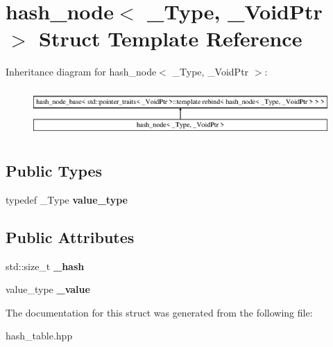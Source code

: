 \section{hash\+\_\+node$<$ \+\_\+\+Type, \+\_\+\+Void\+Ptr $>$ Struct Template Reference}
\label{structhash__node}
Inheritance diagram for hash\+\_\+node$<$ \+\_\+\+Type, \+\_\+\+Void\+Ptr $>$\+:\begin{figure}[H]
\begin{center}
\leavevmode
\includegraphics[height=1.854305cm]{structhash__node}
\end{center}
\end{figure}
\subsection*{Public Types}
\begin{DoxyCompactItemize}
\item 
typedef \+\_\+\+Type {\bfseries value\+\_\+type}\label{structhash__node_a7d3b347b062ea2809d554d629c333b74}

\end{DoxyCompactItemize}
\subsection*{Public Attributes}
\begin{DoxyCompactItemize}
\item 
std\+::size\+\_\+t {\bfseries \+\_\+hash}\label{structhash__node_a7d28a59801cfb2c88c8189c2b23254d1}

\item 
value\+\_\+type {\bfseries \+\_\+value}\label{structhash__node_a8c893ff894a040e9c2c3b7df6240c15f}

\end{DoxyCompactItemize}


The documentation for this struct was generated from the following file\+:\begin{DoxyCompactItemize}
\item 
hash\+\_\+table.\+hpp\end{DoxyCompactItemize}
